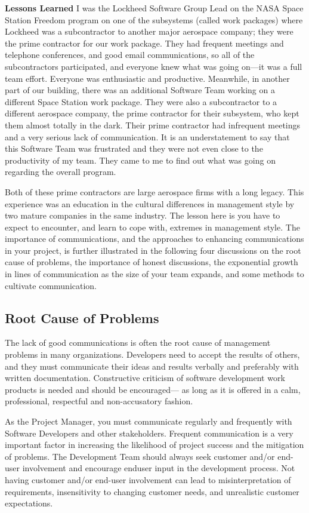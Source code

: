 \documentclass{book}
\begin{document}
\textbf{Lessons Learned} I was the Lockheed Software
Group Lead on the NASA Space Station Freedom
program on one of the subsystems (called work
packages) where Lockheed was a subcontractor
to another major aerospace company; they were
the prime contractor for our work package. They
had frequent meetings and telephone conferences,
and good email communications, so all
of the subcontractors participated, and everyone
knew what was going on—it was a full team effort.
Everyone was enthusiastic and productive.
Meanwhile, in another part of our building,
there was an additional Software Team working
on a different Space Station work package. They
were also a subcontractor to a different aerospace
company, the prime contractor for their subsystem,
who kept them almost totally in the dark.
Their prime contractor had infrequent meetings
and a very serious lack of communication. It is an
understatement to say that this Software Team
was frustrated and they were not even close to
the productivity of my team. They came to me to
find out what was going on regarding the overall
program.

Both of these prime contractors are large
aerospace firms with a long legacy. This experience
was an education in the cultural differences
in management style by two mature companies in the same industry. The lesson here is you have
to expect to encounter, and learn to cope with,
extremes in management style.
The importance of communications, and the approaches
to enhancing communications in your project, is further
illustrated in the following four discussions on the root
cause of problems, the importance of honest discussions,
the exponential growth in lines of communication as the
size of your team expands, and some methods to cultivate
communication.

\subsection{Root Cause of Problems}

The lack of good communications is often the root cause of
management problems in many organizations. Developers
need to accept the results of others, and they must communicate
their ideas and results verbally and preferably with
written documentation. Constructive criticism of software
development work products is needed and should be encouraged—
as long as it is offered in a calm, professional, respectful
and non-accusatory fashion.

As the Project Manager, you must communicate regularly
and frequently with Software Developers and other stakeholders.
Frequent communication is a very important factor
in increasing the likelihood of project success and the mitigation
of problems. The Development Team should always seek
customer and/or end-user involvement and encourage enduser
input in the development process. Not having customer
and/or end-user involvement can lead to misinterpretation of
requirements, insensitivity to changing customer needs, and
unrealistic customer expectations.
\end{document}
